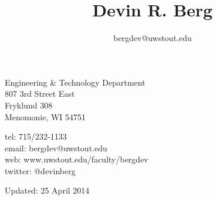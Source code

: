 \documentclass[10pt]{article}
\title{\bfseries\Huge Devin R. Berg}
\author{bergdev@uwstout.edu}
\date{}
\begin{document}
\maketitle
\vspace{1em}
\begin{minipage}[ht]{0.48\textwidth}
Engineering \& Technology Department\\
807 3rd Street East\\
Fryklund 308\\
Menomonie, WI 54751
\end{minipage}
\begin{minipage}[ht]{0.48\textwidth}
\begin{flushright}
tel: 715/232-1133\\
email: bergdev@uwstout.edu\\
web: www.uwstout.edu/faculty/bergdev\\
twitter: @devinberg
\end{flushright}
\end{minipage}
\vspace{20pt}


































\vspace{20pt}
\vspace{20pt}
\scriptsize\hfill Updated: 25 April 2014
\end{document}
